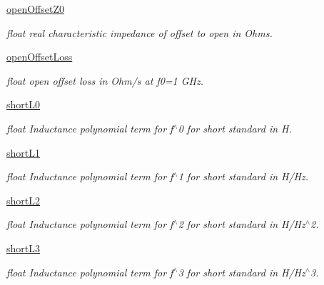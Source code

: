\begin{DoxyCompactItemize}
\hyperlink{classSignalIntegrity_1_1Measurement_1_1CalKit_1_1CalibrationKit_1_1CalibrationConstants_a4c6fb99b586790a8f5a5b1091dff2f3b}{open\+Offset\+Z0}
\begin{DoxyCompactList}\small\item\em float real characteristic impedance of offset to open in Ohms. \end{DoxyCompactList}\item 
\hyperlink{classSignalIntegrity_1_1Measurement_1_1CalKit_1_1CalibrationKit_1_1CalibrationConstants_a7a972d6a44d709e70ef601761d5e1af0}{open\+Offset\+Loss}
\begin{DoxyCompactList}\small\item\em float open offset loss in Ohm/s at f0=1 G\+Hz. \end{DoxyCompactList}\item 
\hyperlink{classSignalIntegrity_1_1Measurement_1_1CalKit_1_1CalibrationKit_1_1CalibrationConstants_aa4cc79e8fcc356090932f2e378e1c497}{short\+L0}
\begin{DoxyCompactList}\small\item\em float Inductance polynomial term for f$^\wedge$0 for short standard in H. \end{DoxyCompactList}\item 
\hyperlink{classSignalIntegrity_1_1Measurement_1_1CalKit_1_1CalibrationKit_1_1CalibrationConstants_afc1b0ffc49a5d1e80d92ad7c6ddf24e2}{short\+L1}
\begin{DoxyCompactList}\small\item\em float Inductance polynomial term for f$^\wedge$1 for short standard in H/\+Hz. \end{DoxyCompactList}\item 
\hyperlink{classSignalIntegrity_1_1Measurement_1_1CalKit_1_1CalibrationKit_1_1CalibrationConstants_adc8558ccc52724c8fbdb6b864a03c035}{short\+L2}
\begin{DoxyCompactList}\small\item\em float Inductance polynomial term for f$^\wedge$2 for short standard in H/\+Hz$^\wedge$2. \end{DoxyCompactList}\item 
\hyperlink{classSignalIntegrity_1_1Measurement_1_1CalKit_1_1CalibrationKit_1_1CalibrationConstants_a88372bf3186e266f5e336ef224dcfd5c}{short\+L3}
\begin{DoxyCompactList}\small\item\em float Inductance polynomial term for f$^\wedge$3 for short standard in H/\+Hz$^\wedge$3. \end{DoxyCompactList}\item 

\end{DoxyCompactItemize}
